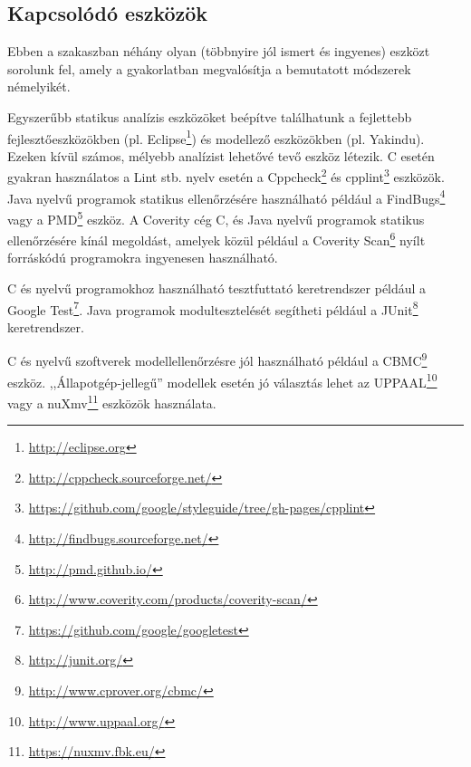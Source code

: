 \subsection{Kapcsolódó eszközök}
Ebben a szakaszban néhány olyan (többnyire jól ismert és ingyenes) eszközt sorolunk fel, amely a gyakorlatban megvalósítja a bemutatott módszerek némelyikét.

Egyszerűbb statikus analízis eszközöket beépítve találhatunk a fejlettebb fejlesztőeszközökben (pl. Eclipse\footnote{\url{http://eclipse.org}}) és modellező eszközökben (pl. Yakindu). Ezeken kívül számos, mélyebb analízist lehetővé tevő eszköz létezik. C esetén gyakran használatos a Lint stb. nyelv esetén a Cppcheck\footnote{\url{http://cppcheck.sourceforge.net/}} és cpplint\footnote{\url{https://github.com/google/styleguide/tree/gh-pages/cpplint}} eszközök. Java nyelvű programok statikus ellenőrzésére használható például a FindBugs\footnote{\url{http://findbugs.sourceforge.net/}} vagy a PMD\footnote{\url{http://pmd.github.io/}} eszköz. A Coverity cég C, \cpp és Java nyelvű programok statikus ellenőrzésére kínál megoldást, amelyek közül például a Coverity Scan\footnote{\url{http://www.coverity.com/products/coverity-scan/}} nyílt forráskódú programokra ingyenesen használható.

C és \cpp nyelvű programokhoz használható tesztfuttató keretrendszer például a Google Test\footnote{\url{https://github.com/google/googletest}}. Java programok modultesztelését segítheti például a JUnit\footnote{\url{http://junit.org/}} keretrendszer.

C és \cpp nyelvű szoftverek modellellenőrzésre jól használható például a CBMC\footnote{\url{http://www.cprover.org/cbmc/}} eszköz. ,,Állapotgép-jellegű'' modellek esetén jó választás lehet az UPPAAL\footnote{\url{http://www.uppaal.org/}} vagy a nuXmv\footnote{\url{https://nuxmv.fbk.eu/}} eszközök használata.

%
%
%
